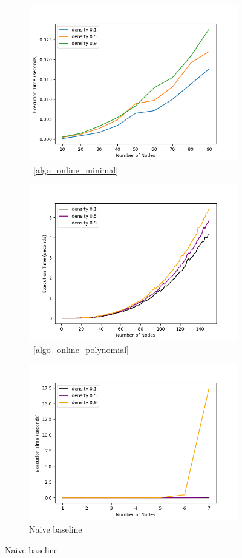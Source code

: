 \documentclass[sigplan,review,anonymous]{acmart}
\begin{document}
{\begin{figure}
    \begin{subfigure}{0.5\linewidth}
      \includegraphics[width=.8\linewidth]{timeVsSize_10_OptimalSet.png}
      \caption{~\ref{algo_online_minimal}}
      \label{fig:sfigOptimalTvsS}
    \end{subfigure}

    \begin{subfigure}{0.5\linewidth}
      \includegraphics[width=.8\linewidth]{timeVsSize_10_Polynomial.png}
      \caption{~\ref{algo_online_polynomial}}
      \label{fig:sfigPolynomialTvsS}
    \end{subfigure}
    
    \begin{subfigure}{0.5\linewidth}
      \includegraphics[width=.8\linewidth]{timeVsSize_10_NaiveChecker.png}
      \caption{Naive baseline}
      \label{fig:sfigNa\"{i}veTvsS}
    \end{subfigure}


\end{figure}}
\end{document}
